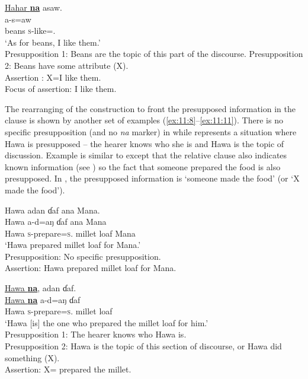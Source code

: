 \ea \label{ex:11:7}
\underline{Hahar  \textbf{na}}  asaw. \\
\gll  {}    a-s=aw\\
      beans  {\PSP} \textsc{s}-like={\oneS}.{\IO}\\
\glt  ‘As for beans, I like them.’ \\
  Presupposition 1:     Beans are the topic of this part of the discourse. 
  Presupposition 2:     Beans have some attribute (X).\\
Assertion :     X=I like them. \\
Focus of assertion:   I like them.
\z

The rearranging of the construction to front the presupposed information in the clause is shown by another set of examples (\ref{ex:11:8}--\ref{ex:11:11}). There is no specific presupposition (and no \textit{na} marker) in  while  represents a situation where Hawa is presupposed -- the hearer knows who she is and Hawa is the topic of discussion. Example  is similar to  except that the relative clause also indicates known information (see ) so the fact that someone prepared the food is also presupposed.  In , the presupposed information is ‘someone made the food’ (or ‘X made the food’). 


\ea \label{ex:11:8}
Hawa  adan  ɗaf  ana  Mana.\\
\gll  Hawa  a-d=aŋ      ɗaf  ana   Mana\\
      Hawa  \textsc{s}-prepare=\textsc{s}.{\IO}    {millet loaf}  {\DAT} Mana\\
\glt  ‘Hawa prepared millet loaf for Mana.’  \\
Presupposition:     No specific presupposition.\\
  Assertion:     Hawa prepared millet loaf for Mana.
\z

\ea \label{ex:11:9}
\underline{Hawa  \textbf{na}},  adan  ɗaf.\\
\gll  \underline{Hawa  \textbf{na}}  a-d=aŋ      ɗaf\\
      {Hawa  {\PSP}}  \textsc{s}-prepare=\textsc{s}.{\IO}    {millet loaf}\\
\glt  ‘Hawa [is] the one who prepared the millet loaf for him.’\\
  Presupposition 1:    The hearer knows who Hawa is.\\
  Presupposition 2:   Hawa is the topic of this section of discourse, or Hawa did something (X).\\
  Assertion:     X= prepared the millet.
\z

